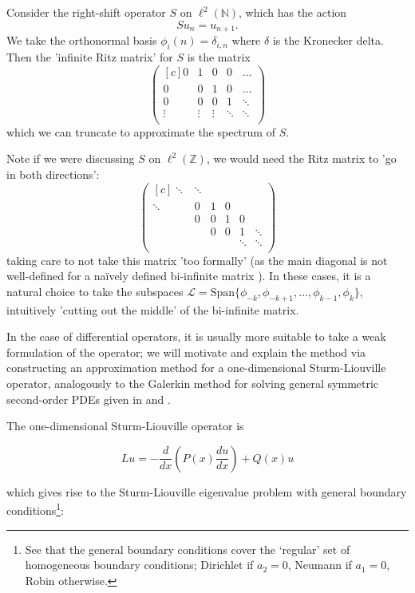 \documentclass[../main.tex]{subfiles}
\begin{document}
\begin{example}
Consider the right-shift operator $S$ on $\ell^2(\mathbb{N})$, which has the action
  $$Su_{n} = u_{n+1}.$$
We take the orthonormal basis $\phi_i(n) = \delta_{i, n}$ where $\delta$ is the Kronecker delta.
Then the 'infinite Ritz matrix' for $S$ is the matrix
  $$
    \begin{pmatrix*}[c]
      0 & 1 & 0 & 0 & \hdots \\
      0 & 0 & 1 & 0 & \hdots \\
      0 & 0 & 0 & 1 & \ddots \\
      \vdots & \vdots & \vdots & \ddots & \ddots \\ 
    \end{pmatrix*}
  $$
which we can truncate to approximate the spectrum of $S$.
\end{example}
Note if we were discussing $S$ on $\ell^2(\mathbb{Z})$, we would need the Ritz matrix to 'go in
both directions':
  $$
    \begin{pmatrix*}[c]
      \ddots & \ddots & & & \\ 
      \ddots & 0 & 1 & 0 & \\
       & 0 & 0 & 1 & 0 & \\
       & & 0 & 0 & 1 & \ddots \\
       & & & & \ddots & \ddots \\ 
    \end{pmatrix*}
  $$
taking care to not take this matrix 'too formally' (as the main diagonal is not well-defined
for a na\"ively defined bi-infinite matrix \cite{lindner2013where}). In these cases, it is
a natural choice to take the subspaces 
$\mathcal{L} = \text{Span}\{\phi_{-k}, \phi_{-k+1}, \hdots, \phi_{k-1}, \phi_k\}$, 
intuitively 'cutting out the middle' of the bi-infinite matrix.

In the case of differential operators, it is usually more suitable to
take a weak formulation of the operator; we will motivate and
explain the method via constructing an approximation method for a
one-dimensional Sturm-Liouville operator,
analogously to the Galerkin method for solving general symmetric second-order
PDEs given in \cite{suli2003introduction} and \cite{pryce1993numerical}. 

The one-dimensional Sturm-Liouville operator is

$$Lu = - \frac{d}{dx}(P(x)\frac{du}{dx}) + Q(x)u$$ 

which gives rise to the Sturm-Liouville eigenvalue problem with general boundary
conditions\footnote{See that the general boundary conditions cover the `regular'
set of homogeneous boundary conditions; Dirichlet if $a_2 = 0$, Neumann if $a_1
= 0$, Robin otherwise.}:
\end{document}
